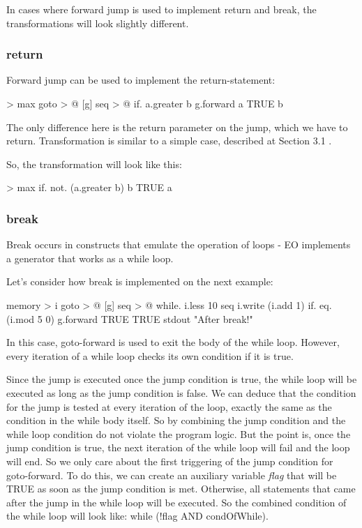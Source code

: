 \documentclass[sigplan,review,11pt,nonacm,natbib=false]{acmart}
\begin{document}
In cases where forward jump is used to implement return and break, the transformations will look slightly different.

\subsubsection{return}
Forward jump can be used to implement the return-statement:
\begin{ffcode}
[a b] > max
 goto > @
  [g]
   seq > @
    if.
     a.greater b
     g.forward a
     TRUE
    b
\end{ffcode}

The only difference here is the return parameter on the jump, which we have to return. Transformation is similar to a simple case, described at Section 3.1 .

So, the transformation will look like this:
\begin{ffcode}
[a b] > max
 if.
  not. (a.greater b)
  b
  TRUE
 a
\end{ffcode}

\subsubsection{break}
Break occurs in constructs that emulate the operation of loops - EO implements a generator that works as a while loop.

Let's consider how break is implemented on the next example:
\begin{ffcode}
[]
 memory > i
 goto > @
  [g]
   seq > @
    while.
     i.less 10
     seq
      i.write (i.add 1)
      if.
       eq. (i.mod 5 0)
       g.forward TRUE
       TRUE
      stdout "After break!"
\end{ffcode}

In this case, goto-forward is used to exit the body of the while loop. However, every iteration of a while loop checks its own condition if it is true. 

Since the jump is executed once the jump condition is true, the while loop will be executed as long as the jump condition is false. We can deduce that the condition for the jump is tested at every iteration of the loop, exactly the same as the condition in the while body itself.
So by combining the jump condition and the while loop condition do not violate the program logic. But the point is, once the jump condition is true, the next iteration of the while loop will fail and the loop will end.
So we only care about the first triggering of the jump condition for goto-forward. To do this, we can create an auxiliary variable \emph{flag} that will be TRUE as soon as the jump condition is met.
Otherwise, all statements that came after the jump in the while loop will be executed.
So the combined condition of the while loop will look like: while (!flag AND condOfWhile).
\end{document}
